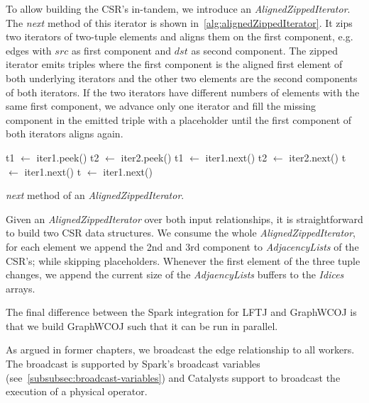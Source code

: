 To allow building the CSR's in-tandem, we introduce an \textit{AlignedZippedIterator}.
The \textit{next} method of this iterator is shown in~\cref{alg:alignedZippedIterator}.
It zips two iterators of two-tuple elements and aligns them on the first component, e.g. edges with $src$ as first component and $dst$ as
second component.
The zipped iterator emits triples where the first component is the aligned first element of both underlying iterators and the other
two elements are the second components of both iterators.
If the two iterators have different numbers of elements with the same first component, we advance only one iterator and fill the missing
component in the emitted triple with a placeholder until the first component of both iterators aligns again.

\begin{algorithm}
   {
    t1 $\leftarrow$ iter1.peek() \;
    t2 $\leftarrow$ iter2.peek() \;
     {
      t1 $\leftarrow$ iter1.next()\;
      t2 $\leftarrow $ iter2.next()\;
      \;
    }  {
      t $\leftarrow$ iter1.next()\;
       \;
    } 
  }  {
    t $\leftarrow$ iter1.next() \;
     \;
  } 
  \caption{\textit{next} method of an \textit{AlignedZippedIterator}.}
  \label{alg:alignedZippedIterator}
\end{algorithm}


Given an \textit{AlignedZippedIterator} over both input relationships, it is straightforward to build two CSR data structures.
We consume the whole \textit{AlignedZippedIterator}, for each element we append the 2nd and 3rd component to \textit{AdjacencyLists} of
the CSR's;
while skipping placeholders.
Whenever the first element of the three tuple changes, we append the current size of the \textit{AdjaencyLists} buffers to the
\textit{Idices} arrays.

The final difference between the Spark integration for \textsc{LFTJ} and GraphWCOJ is that we build GraphWCOJ such that it can
be run in parallel.

As argued in former chapters, we broadcast the edge relationship to all workers.
The broadcast is supported by Spark's broadcast variables (see~\cref{subsubsec:broadcast-variables}) and Catalysts support to broadcast
the execution of a physical operator.

